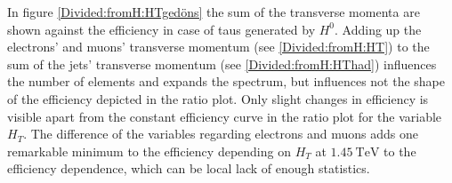 %
In figure \ref{Divided:fromH:HTgedöns} the sum of the transverse momenta are shown against the efficiency in case of taus generated by $H^0$. Adding up the electrons' and muons' transverse momentum (see \ref{Divided:fromH:HT}) to the sum of the jets' transverse momentum (see \ref{Divided:fromH:HThad}) influences the number of elements and expands the spectrum, but influences not the shape of the efficiency depicted in the ratio plot. Only slight changes in efficiency is visible apart from the constant efficiency curve in the ratio plot for the variable $H_T$. The difference of the variables regarding electrons and muons adds one remarkable minimum to the efficiency depending on $H_T$ at $\SI{1.45}{\tera\electronvolt}$ to the efficiency dependence, which can be local lack of enough statistics.\newline
